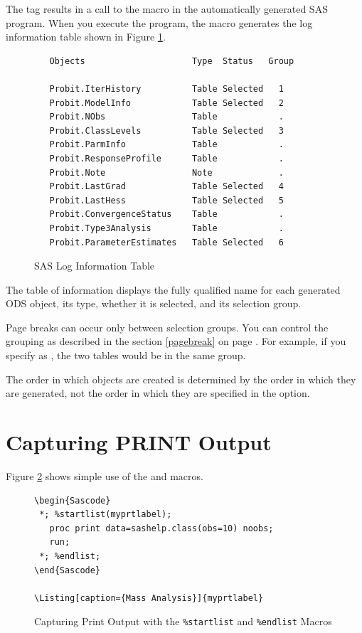 \documentclass[article,oneside]{memoir}
\begin{document}
The  tag results in a call to the  macro in the
automatically generated SAS program. When you execute the program,
the  macro generates the log information table shown in
Figure \ref{loginfo}.

\begin{figure}[H]
\begin{snugshade}
\begin{verbatim}
   Objects                     Type  Status   Group

   Probit.IterHistory          Table Selected   1
   Probit.ModelInfo            Table Selected   2
   Probit.NObs                 Table            .
   Probit.ClassLevels          Table Selected   3
   Probit.ParmInfo             Table            .
   Probit.ResponseProfile      Table            .
   Probit.Note                 Note             .
   Probit.LastGrad             Table Selected   4
   Probit.LastHess             Table Selected   5
   Probit.ConvergenceStatus    Table            .
   Probit.Type3Analysis        Table            .
   Probit.ParameterEstimates   Table Selected   6
\end{verbatim}
\end{snugshade}
\caption{SAS Log Information Table}\label{loginfo}
\end{figure}

  The table of information displays the fully qualified name for each
  generated ODS object, its type, whether it is selected, and its
  selection group.

  Page breaks can occur only between
  selection groups. You can control the grouping
  as described in the section \ref{pagebreak} on page \pageref{pagebreak}.
  For example, if you specify
 as ,
  the two tables would be in the same group.

  The order in which objects are created is determined by the
  order in which they are generated, not the order in which they are
  specified in the  option.

\section{Capturing PRINT Output}
  Figure \ref{printoutput} shows simple use of the  and 
  macros.

\begin{figure}[H]
\begin{snugshade}
\begin{verbatim}
\begin{Sascode}
 *; %startlist(myprtlabel);
   proc print data=sashelp.class(obs=10) noobs;
   run;
 *; %endlist;
\end{Sascode}

\Listing[caption={Mass Analysis}]{myprtlabel}
\end{verbatim}
\end{snugshade}
\caption{Capturing Print Output with the \texttt{\%startlist} and
\texttt{\%endlist} Macros}\label{printoutput}
\end{figure}
\end{document}
